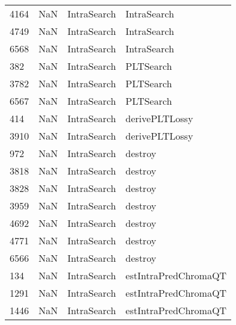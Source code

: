 \begin{tabular}{llll}
4164 &                   NaN &                IntraSearch &                               IntraSearch \\
4749 &                   NaN &                IntraSearch &                               IntraSearch \\
6568 &                   NaN &                IntraSearch &                               IntraSearch \\
382  &                   NaN &                IntraSearch &                                 PLTSearch \\
3782 &                   NaN &                IntraSearch &                                 PLTSearch \\
6567 &                   NaN &                IntraSearch &                                 PLTSearch \\
414  &                   NaN &                IntraSearch &                            derivePLTLossy \\
3910 &                   NaN &                IntraSearch &                            derivePLTLossy \\
972  &                   NaN &                IntraSearch &                                   destroy \\
3818 &                   NaN &                IntraSearch &                                   destroy \\
3828 &                   NaN &                IntraSearch &                                   destroy \\
3959 &                   NaN &                IntraSearch &                                   destroy \\
4692 &                   NaN &                IntraSearch &                                   destroy \\
4771 &                   NaN &                IntraSearch &                                   destroy \\
6566 &                   NaN &                IntraSearch &                                   destroy \\
134  &                   NaN &                IntraSearch &                      estIntraPredChromaQT \\
1291 &                   NaN &                IntraSearch &                      estIntraPredChromaQT \\
1446 &                   NaN &                IntraSearch &                      estIntraPredChromaQT \\

\end{tabular}
